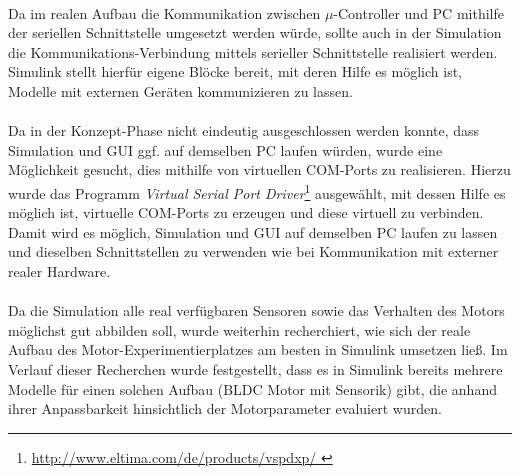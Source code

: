 \paragraph{}
Da im realen Aufbau die Kommunikation zwischen $\mu$-Controller und PC mithilfe der seriellen Schnittstelle umgesetzt werden würde, sollte auch in der Simulation die Kommunikations-Verbindung mittels serieller Schnittstelle realisiert werden. 
Simulink stellt hierfür eigene Blöcke bereit, mit deren Hilfe es möglich ist, Modelle mit externen Geräten kommunizieren zu lassen.

\paragraph{}
Da in der Konzept-Phase nicht eindeutig ausgeschlossen werden konnte, dass Simulation und GUI ggf. auf demselben PC laufen würden, wurde eine Möglichkeit gesucht, dies mithilfe von virtuellen COM-Ports zu realisieren. 
Hierzu wurde das Programm \textit{Virtual Serial Port Driver}\footnote{\url{http://www.eltima.com/de/products/vspdxp/ }}
ausgewählt, mit dessen Hilfe es möglich ist, virtuelle COM-Ports zu erzeugen und diese virtuell zu verbinden. Damit wird es möglich, Simulation und GUI auf demselben PC laufen zu lassen und dieselben Schnittstellen zu verwenden wie bei Kommunikation mit externer realer Hardware.

\paragraph{}
Da die Simulation alle real verfügbaren Sensoren sowie das Verhalten des Motors möglichst gut abbilden soll, wurde weiterhin recherchiert, wie sich der reale Aufbau des Motor-Experimentierplatzes am besten in Simulink umsetzen ließ. Im Verlauf dieser Recherchen wurde festgestellt, dass es in Simulink bereits mehrere Modelle für einen solchen Aufbau (BLDC Motor mit Sensorik) gibt, die anhand ihrer Anpassbarkeit hinsichtlich der Motorparameter evaluiert wurden. 

